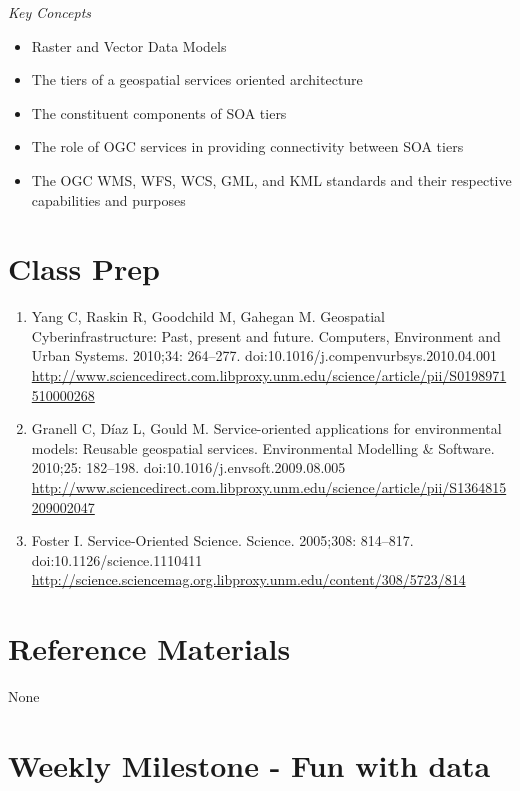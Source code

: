 \documentclass[]{book}
\begin{document}
\emph{Key Concepts}

\begin{itemize}
\item
  Raster and Vector Data Models
\item
  The tiers of a geospatial services oriented architecture
\item
  The constituent components of SOA tiers
\item
  The role of OGC services in providing connectivity between SOA tiers
\item
  The OGC WMS, WFS, WCS, GML, and KML standards and their respective
  capabilities and purposes
\end{itemize}

\section{Class Prep}\label{week05-prep}

\begin{enumerate}
\def\labelenumi{\arabic{enumi}.}
\item
  Yang C, Raskin R, Goodchild M, Gahegan M. Geospatial
  Cyberinfrastructure: Past, present and future. Computers, Environment
  and Urban Systems. 2010;34: 264--277.
  doi:10.1016/j.compenvurbsys.2010.04.001
  \url{http://www.sciencedirect.com.libproxy.unm.edu/science/article/pii/S0198971510000268}
\item
  Granell C, Díaz L, Gould M. Service-oriented applications for
  environmental models: Reusable geospatial services. Environmental
  Modelling \& Software. 2010;25: 182--198.
  doi:10.1016/j.envsoft.2009.08.005
  \url{http://www.sciencedirect.com.libproxy.unm.edu/science/article/pii/S1364815209002047}
\item
  Foster I. Service-Oriented Science. Science. 2005;308: 814--817.
  doi:10.1126/science.1110411
  \url{http://science.sciencemag.org.libproxy.unm.edu/content/308/5723/814}
\end{enumerate}

\section{Reference Materials}\label{week05-reference}

None

\section{Weekly Milestone - Fun with data}\label{week05-milestone}
\end{document}
